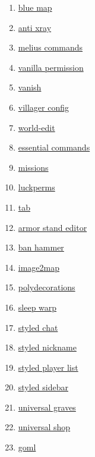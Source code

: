 \begin{enumerate}
    \item \href{https://github.com/BlueMap-Minecraft/BlueMap}{blue map}
    \item \href{https://github.com/DrexHD/AntiXray}{anti xray}
    \item \href{https://github.com/DrexHD/MeliusCommands}{melius commands}
    \item \href{https://github.com/DrexHD/VanillaPermissions}{vanilla permission}
    \item \href{https://github.com/DrexHD/Vanish}{vanish}
    \item \href{https://github.com/DrexHD/VillagerConfig/}{villager config}
    \item \href{https://github.com/EngineHub/WorldEdit/}{world-edit}
    \item \href{https://github.com/John-Paul-R/Essential-Commands}{essential commands}
    \item \href{https://github.com/Kryeit/Missions}{missions}
    \item \href{https://github.com/LuckPerms/LuckPerms}{luckperms}
    \item \href{https://github.com/NEZNAMY/TAB}{tab}
    \item \href{https://github.com/Patbox/ArmorStandEditor}{armor stand editor}
    \item \href{https://github.com/Patbox/BanHammer}{ban hammer}
    \item \href{https://github.com/Patbox/Image2Map}{image2map}
    \item \href{https://github.com/Patbox/PolyDecorations}{polydecorations}
    \item \href{https://github.com/Patbox/SleepWarp}{sleep warp}
    \item \href{https://github.com/Patbox/StyledChat}{styled chat}
    \item \href{https://github.com/Patbox/StyledNicknames}{styled nickname}
    \item \href{https://github.com/Patbox/StyledPlayerList}{styled player list}
    \item \href{https://github.com/Patbox/StyledSidebars}{styled sidebar}
    \item \href{https://github.com/Patbox/UniversalGraves}{universal graves}
    \item \href{https://github.com/Patbox/UniversalShops}{universal shop}
    \item \href{https://github.com/Patbox/get-off-my-lawn-reserved}{goml}

\end{enumerate}
